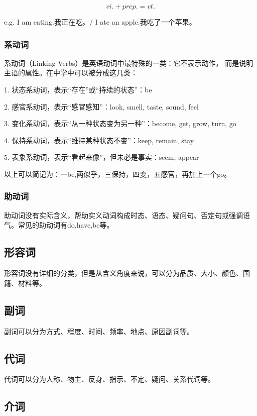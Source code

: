 \documentclass[UTF8]{ctexbook}
\begin{document}
\[
vi.+prep.=vt.
\]

e.g. I am eating.我正在吃。/ I ate an apple.我吃了一个苹果。 

\subsubsection{系动词}

系动词（Linking Verbs）是英语动词中最特殊的一类：它不表示动作，
而是说明主语的属性。在中学中可以被分成这几类：

1. 状态系动词，表示“存在”或“持续的状态”：be

2. 感官系动词，表示“感官感知”：look, smell, taste, sound, feel	

3. 变化系动词，表示“从一种状态变为另一种”：become, get, grow, turn, go	

4. 保持系动词，表示“维持某种状态不变”：keep, remain, stay	

5. 表象系动词，表示“看起来像”，但未必是事实：seem, appear

以上可以简记为：一be,两似乎，三保持，四变，五感官，再加上一个go。

\subsubsection{助动词}

助动词没有实际含义，帮助实义动词构成时态、语态、疑问句、否定句或强调语气。常见的助动词有do,have,be等。

\subsection{形容词}

形容词没有详细的分类，但是从含义角度来说，可以分为品质、大小、颜色、国籍、材料等。

\subsection{副词}

副词可以分为方式、程度、时间、频率、地点、原因副词等。

\subsection{代词}

代词可以分为人称、物主、反身、指示、不定、疑问、关系代词等。

\subsection{介词}
\end{document}
